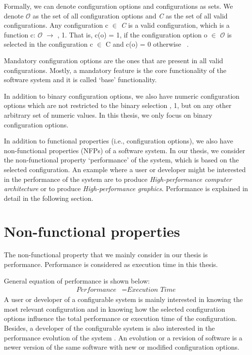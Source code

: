 Formally, we can denote configuration options and configurations as sets. We denote $\mathcal{O}$ as the set of all configuration options and \textit{C} as the set of all valid configurations. Any configuration c $\in$ \textit{C} is a valid configuration, which is a function c: $\mathcal{O}$ $\rightarrow$ , 1\textbraceright. That is, c(o) = 1, if the configuration option o $\in$  $\mathcal{O}$ is selected in the configuration c $\in$ C and c(o) = 0 otherwise  ~\cite{DBLP:conf/sigsoft/SiegmundGAK15}.

Mandatory configuration options are the ones that are present in all valid configurations. Mostly, a mandatory feature is the core functionality of the software system and it is called \enquote*{base} functionality.

In addition to binary configuration options, we also have numeric configuration options which are not restricted to the binary selection , 1\textbraceright, but on any other arbitrary set of numeric values. In this thesis, we only focus on binary configuration options.

In addition to functional properties (i.e., configuration options), we also have non-functional properties (NFPs) \cite{DBLP:conf/icse/SiegmundKKABRS12} of a software system. In our thesis, we consider the non-functional property \enquote*{performance} of the system, which is based on the selected configuration. An example where a user or developer might be interested in the performance of the system are to produce \textit{High-performance computer architecture}\cite{DBLP:journals/tog/KenzelKSS18} or to produce \textit{High-performance graphics}\cite{DBLP:conf/ppopp/AwadAJFO19}. Performance is explained in detail in the following section.


\section{Non-functional properties}
\label{sec:2.2}
The non-functional property that we mainly consider in our thesis is performance. Performance is considered as execution time in this thesis. 

General equation of performance is shown below:
\begin{align*}
 {\textit{Performance}} &= {\textit{Execution Time}}
\end{align*}
A user or developer of a configurable system is mainly interested in knowing the most relevant configuration and in knowing how the selected configuration options influence the total performance or execution time of the configuration. Besides, a developer of the configurable system is also interested in the performance evolution of the system \cite{DBLP:conf/pldi/JinSSSL12}. An evolution or a revision of software is a newer version of the same software with new or modified configuration options.


